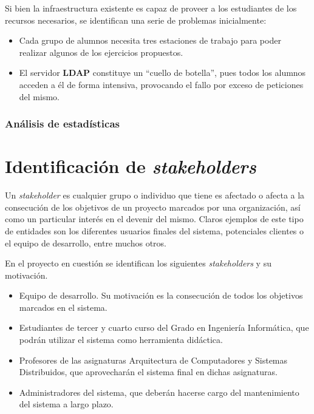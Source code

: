 Si bien la infraestructura existente es capaz de proveer a los estudiantes de los recursos necesarios, se identifican una serie de problemas inicialmente:

\begin{itemize}
  \item Cada grupo de alumnos necesita tres estaciones de trabajo para poder realizar algunos de los ejercicios propuestos.
  \item El servidor \textbf{LDAP} constituye un ``cuello de botella'', pues todos los alumnos acceden a él de forma intensiva, provocando el fallo por exceso de peticiones del mismo.
\end{itemize}

\subsubsection{Análisis de estadísticas}
\label{dominio:estadisticast}

\section{Identificación de \textit{stakeholders}}

Un \textit{stakeholder} es cualquier grupo o individuo que tiene es afectado o afecta a la consecución de los objetivos de un proyecto marcados por una organización, así como un particular interés en el devenir del mismo. Claros ejemplos de este tipo de entidades son los diferentes usuarios finales del sistema, potenciales clientes o el equipo de desarrollo, entre muchos otros.

En el proyecto en cuestión se identifican los siguientes \textit{stakeholders} y su motivación.

\begin{itemize}
  \item Equipo de desarrollo. Su motivación es la consecución de todos los objetivos marcados en el sistema.
  \item Estudiantes de tercer y cuarto curso del Grado en Ingeniería Informática, que podrán utilizar el sistema como herramienta didáctica.
  \item Profesores de las asignaturas Arquitectura de Computadores y Sistemas Distribuidos, que aprovecharán el sistema final en dichas asignaturas.
  \item Administradores del sistema, que deberán hacerse cargo del mantenimiento del sistema a largo plazo.
\end{itemize}

